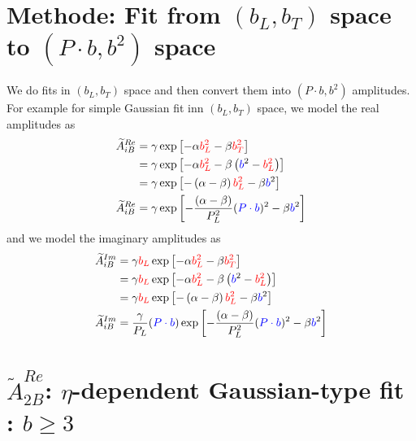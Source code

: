 \documentclass[]{article}
\numberwithin{equation}{section}
\newcommand{\tAmp}{\widetilde{A}}
\begin{document}
\section{Methode: Fit from $(b_{L}, b_{T})$ space to $(P\cdot b, b^2)$ space}
We do fits in $(b_{L}, b_{T})$ space and then convert them into $(P\cdot b, b^2)$ amplitudes. For example for simple Gaussian fit inn $(b_{L}, b_{T})$ space, we model the real amplitudes as
\begin{align}
    \tAmp^{Re}_{iB}&=\gamma \exp{\left[-\alpha \textcolor{red}{b_{L}^{2}}-\beta \textcolor{red}{b_{T}^{2}}\right]}\\
    &=\gamma \exp{\left[-\alpha \textcolor{red}{b_{L}^{2}}-\beta \left(\textcolor{blue}{b}^{2}-\textcolor{red}{b_{L}^{2}}\right)\right]}\\
    &=\gamma \exp{\left[-\left(\alpha-\beta\right) \textcolor{red}{b_{L}^{2}}-\beta \textcolor{blue}{b}^{2}\right]}\\
   \tAmp^{Re}_{iB} &=\gamma \exp{\left[-\frac{\left(\alpha-\beta\right)}{P_{L}^2} (\textcolor{blue}{P\cdot b})^{2}-\beta \textcolor{blue}{b}^{2}\right]}
\end{align}
and we model the imaginary amplitudes as
\begin{align}
    \tAmp^{Im}_{iB}&=\gamma \textcolor{red}{b_{L}}\exp{\left[-\alpha \textcolor{red}{b_{L}^{2}}-\beta \textcolor{red}{b_{T}^{2}}\right]}\\
    &=\gamma \textcolor{red}{b_{L}}\exp{\left[-\alpha \textcolor{red}{b_{L}^{2}}-\beta \left(\textcolor{blue}{b}^{2}-\textcolor{red}{b_{L}^{2}}\right)\right]}\\
    &=\gamma \textcolor{red}{b_{L}}\exp{\left[-\left(\alpha-\beta\right) \textcolor{red}{b_{L}^{2}}-\beta \textcolor{blue}{b}^{2}\right]}\\
    \tAmp^{Im}_{iB} &=\frac{\gamma}{P_{L}} (\textcolor{blue}{P\cdot b}) \exp{\left[-\frac{\left(\alpha-\beta\right)}{P_{L}^2} (\textcolor{blue}{P\cdot b})^{2}-\beta \textcolor{blue}{b}^{2}\right]}
\end{align}

\section{$\tAmp^{Re}_{2B}$: $\eta$-dependent Gaussian-type fit : $b\geq3$}
\end{document}
